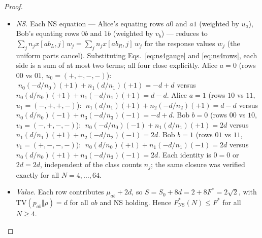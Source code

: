 \documentclass[aps,pra,reprint,superscriptaddress,floatfix]{revtex4-2}
\newcommand{\TV}{\mathrm{TV}}
\begin{document}
\begin{proof}
\begin{itemize}
identically for each row, so every row has TV exactly $d$ and is bang--bang
in its $\sigma_{ab}$-direction. Feasibility $p\ge0$ requires
$d/n_r\le 1/N\iff n_r\ge dN$ for all $r$ --- precisely the case-checked
inequality $\lfloor N/4\rfloor\ge(\sqrt{2}-1)N/4$ of
Sec.~\ref{sec:headline}.
\item \emph{NS.} Each NS equation --- Alice's equating rows $a0$ and $a1$
(weighted by $u_a$), Bob's equating rows $0b$ and $1b$ (weighted by $v_b$) ---
reduces to $\sum_j n_j x[ab_L,j]\,w_j=\sum_j n_j x[ab_R,j]\,w_j$ for the
response values $w_j$ (the uniform parts cancel). Substituting
Eqs.~\eqref{eq:ns4gauge} and \eqref{eq:ns4rows}, each side is a sum of at
most two terms; all four close explicitly. Alice $a{=}0$ (rows $00$ vs $01$,
$u_0=(+,+,-,-)$): $\;n_0(-d/n_0)(+1)+n_1(d/n_1)(+1)=-d+d$ versus
$n_0(d/n_0)(+1)+n_1(-d/n_1)(+1)=d-d$. Alice $a{=}1$ (rows $10$ vs $11$,
$u_1=(-,+,+,-)$): $\;n_1(d/n_1)(+1)+n_2(-d/n_2)(+1)=d-d$ versus
$n_0(d/n_0)(-1)+n_3(-d/n_3)(-1)=-d+d$. Bob $b{=}0$ (rows $00$ vs $10$,
$v_0=(-,+,-,-)$): $\;n_0(-d/n_0)(-1)+n_1(d/n_1)(+1)=2d$ versus
$n_1(d/n_1)(+1)+n_2(-d/n_2)(-1)=2d$. Bob $b{=}1$ (rows $01$ vs $11$,
$v_1=(+,-,-,-)$): $\;n_0(d/n_0)(+1)+n_1(-d/n_1)(-1)=2d$ versus
$n_0(d/n_0)(+1)+n_3(-d/n_3)(-1)=2d$. Each identity is $0=0$ or $2d=2d$,
independent of the class counts $n_j$; the same closure was verified exactly
for all $N=4,\dots,64$.
\item \emph{Value.} Each row contributes $\mu_{ab}+2d$, so
$S=S_0+8d=2+8F^*=2\sqrt{2}$, with $\TV(p_{ab}\Vert\rho)=d$ for all $ab$ and
NS holding. Hence $F^*_{\mathrm{NS}}(N)\le F^*$ for all $N\ge4$.
\end{itemize}


\end{proof}
\end{document}
